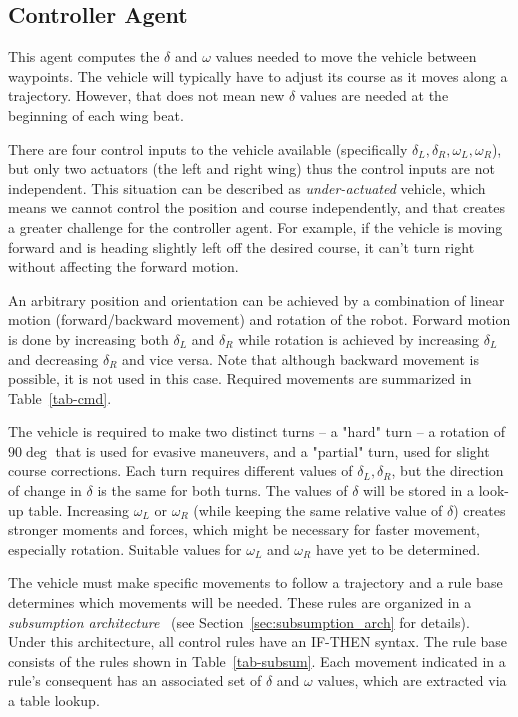 \subsection{Controller Agent}
\label{subsec-controlerAgent}
This agent computes the $\delta$ and $\omega$ values needed to move the vehicle between waypoints. The vehicle will typically have to adjust its course as it moves along a trajectory. However, that does not mean new $\delta$ values are needed at the beginning of each wing beat.

There are four control inputs to the vehicle available (specifically $\delta_L, \delta_R, \omega_L, \omega_R$), but only two actuators (the left and right wing) thus the control inputs are not independent. This situation can be described as \textit{under-actuated} vehicle, which means we cannot control the position and course independently, and that creates a greater challenge for the controller agent. For example, if the vehicle is moving forward and is heading slightly left off the desired course, it can't turn right without affecting the forward motion. 

An arbitrary position and orientation can be achieved by a combination of linear motion (forward/backward movement) and rotation of the robot. Forward motion is done by increasing both $\delta_L$ and $\delta_R$ while rotation is achieved by increasing $\delta_L$ and decreasing $\delta_R$ and vice versa. Note that although backward movement is possible, it is not used in this case. Required movements are summarized in Table~\ref{tab-cmd}.

The vehicle is required to make two distinct turns -- a "hard" turn -- a rotation of $90\deg$ that is used for evasive maneuvers, and a "partial" turn, used for slight course corrections. Each turn requires different values of $\delta_L, \delta_R$, but the direction of change in $\delta$ is the same for both turns. The values of $\delta$ will be stored in a look-up table. Increasing $\omega_L$ or $\omega_R$ (while keeping the same relative value of $\delta$) creates stronger moments and forces, which might be necessary for faster movement, especially rotation. Suitable values for $\omega_L$ and  $\omega_R$ have yet to be determined.

The vehicle must make specific movements to follow a trajectory and a rule base determines which movements will be needed. These rules are organized in a  \textit{subsumption architecture}~\cite{brooks} (see Section~\ref{sec:subsumption_arch} for details).  Under this architecture, all control rules have an IF-THEN syntax. The rule base consists of the rules shown in Table~\ref{tab-subsum}. Each movement indicated in a rule's consequent has an associated set of $\delta$ and $\omega$ values, which are extracted via a table lookup.

